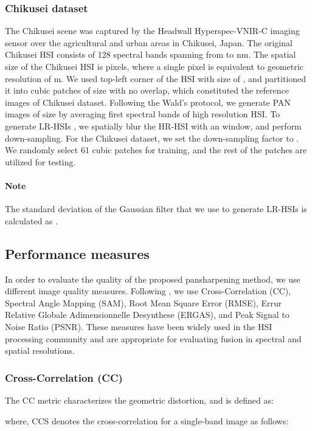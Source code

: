 \documentclass[journal]{IEEEtran}
\begin{document}
        \subsubsection{Chikusei dataset \cite{Chikusei_dataset}} The Chikusei scene was captured by the Headwall Hyperspec-VNIR-C imaging sensor over the agricultural and urban areas in Chikusei, Japan. The original Chikusei HSI consists of 128 spectral bands spanning from  to  nm. The spatial size of the Chikusei HSI is  pixels, where a single pixel is equivalent to geometric resolution of  m. We used top-left corner of the HSI with size of , and partitioned it into  cubic patches of size  with no overlap, which constituted the reference images  of Chikusei dataset. Following the Wald's protocol, we generate PAN images of size  by averaging first  spectral bands of high resolution HSI. To generate LR-HSIs , we spatially blur the HR-HSI with an  window, and perform  down-sampling. For the Chikusei dataset, we set the down-sampling factor  to . We randomly select 61 cubic patches for training, and the rest of the patches are utilized for  testing.
        
        \paragraph*{Note} The standard deviation  of the Gaussian filter that we use to generate LR-HSIs is calculated as  \cite{Panshaperpening_wei_thesis}. 
        
    \subsection{Performance measures}
    In order to evaluate the quality of the proposed pansharpening method, we use different image quality measures. Following \cite{DHP-DARN}, we use Cross-Correlation (CC), Spectral Angle Mapping (SAM), Root Mean Square Error (RMSE), Errur Relative Globale Adimensionnelle Desynthese (ERGAS), and Peak Signal to Noise Ratio (PSNR). These measures have been widely used in the HSI processing community and are appropriate for evaluating  fusion in spectral and spatial resolutions.
    
\subsubsection{Cross-Correlation (CC)} The CC metric characterizes the geometric distortion, and is defined as:
    
    where, CCS denotes the cross-correlation for a single-band image as follows:
    
\end{document}
